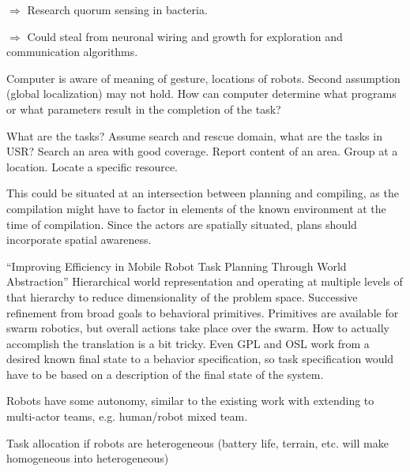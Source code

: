 \documentclass[]{article}
\begin{document}
$\Rightarrow$ Research quorum sensing in bacteria.

$\Rightarrow$ Could steal from neuronal wiring and growth for exploration and communication algorithms. 



Computer is aware of meaning of gesture, locations of robots. 
Second assumption (global localization) may not hold. 
How can computer determine what programs or what parameters result in the completion of the task?

What are the tasks? Assume search and rescue domain, what are the tasks in USR? Search an area with good coverage. Report content of an area. Group at a location. Locate a specific resource. 

This could be situated at an intersection between planning and compiling, as the compilation might have to factor in elements of the known environment at the time of compilation. Since the actors are spatially situated, plans should incorporate spatial awareness.  

``Improving Efficiency in Mobile Robot Task Planning Through World Abstraction'' \cite{galindo2004improving} Hierarchical world representation and operating at multiple levels of that hierarchy to reduce dimensionality of the problem space. Successive refinement from broad goals to behavioral primitives. Primitives are available for swarm robotics, but overall actions take place over the swarm. How to actually accomplish the translation is a bit tricky. Even GPL and OSL work from a desired known final state to a behavior specification, so task specification would have to be based on a description of the final state of the system. 

Robots have some autonomy, similar to the existing work with extending to multi-actor teams, e.g. human/robot mixed team. 

Task allocation if robots are heterogeneous (battery life, terrain, etc. will make homogeneous into heterogeneous)
\end{document}
